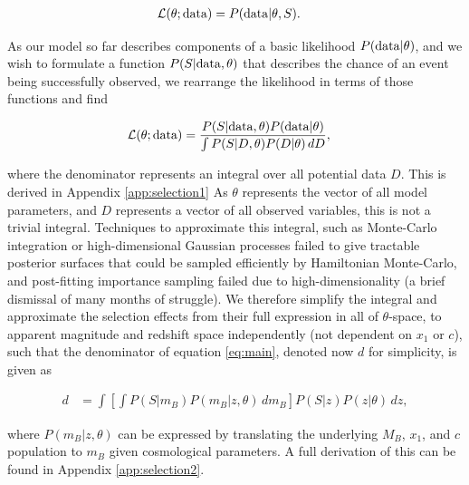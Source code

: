 \documentclass[a4paper,fleqn,usenatbib]{emulateapj}
\begin{document}
\begin{align}
\mathcal{L}(\theta; {\rm data}) &= P({\rm data} | \theta, S). \label{eq:like}
\end{align}

As our model so far describes components of a basic likelihood $P({\rm data}|\theta)$, and we wish to formulate a function $P(S|{\rm data},\theta)$ that describes the chance of an event being successfully observed, we rearrange the likelihood in terms of those functions and find

\begin{align}
\mathcal{L}(\theta; {\rm data}) &= \frac{P(S|{\rm data},\theta) P({\rm data}|\theta)}{\int P(S | D, \theta) P(D|\theta)\, dD}, \label{eq:main}
\end{align}

where the denominator represents an integral over all potential data $D$. This is derived in Appendix \ref{app:selection1} As $\theta$ represents the vector of all model parameters, and $D$ represents a vector of all observed variables, this is not a trivial integral. Techniques to approximate this integral, such as Monte-Carlo integration or high-dimensional Gaussian processes failed to give tractable posterior surfaces that could be sampled efficiently by Hamiltonian Monte-Carlo, and post-fitting importance sampling failed due to high-dimensionality (a brief dismissal of many months of struggle). We therefore simplify the integral and approximate the selection effects from their full expression in all of $\theta$-space, to apparent magnitude and redshift space independently (not dependent on $x_1$ or $c$), such that the denominator of equation \eqref{eq:main}, denoted now $d$ for simplicity, is given as

\begin{align}
d &= \int  \left[ \int P(S|m_B) P(m_B | z, \theta)\, d m_B \right] P(S|z) P(z|\theta)\, dz, \label{eq:w1}
\end{align}

where $P(m_B | z, \theta)$ can be expressed by translating the underlying $M_B$, $x_1$, and $c$ population to $m_B$ given cosmological parameters. A full derivation of this can be found in Appendix \ref{app:selection2}.
\end{document}
